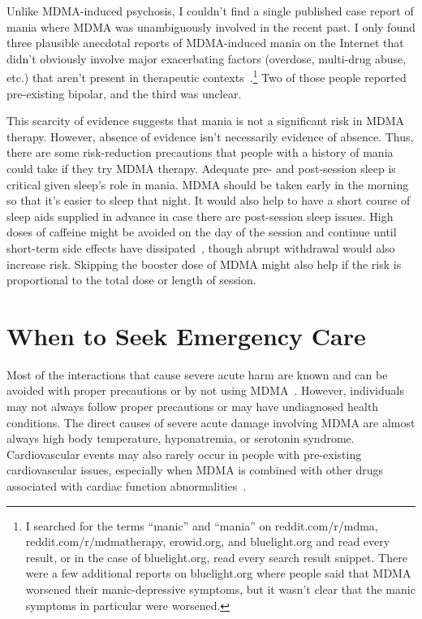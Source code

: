 \documentclass[11pt,oneside]{book}
\let\cite\parencite
\begin{document}
\begin{itemize}
    Unlike MDMA-induced psychosis, I couldn't find a single published case report of mania where MDMA was unambiguously involved in the recent past. I only found three plausible anecdotal reports of MDMA-induced mania on the Internet that didn't obviously involve major exacerbating factors (overdose, multi-drug abuse, etc.) that aren't present in therapeutic contexts~\cite{erowidMania1,erowidMania2,bluelightMania1}.\footnote{I searched for the terms \enquote{manic} and \enquote{mania} on reddit.com/r/mdma, reddit.com/r/mdmatherapy, erowid.org, and bluelight.org and read every result, or in the case of bluelight.org, read every search result snippet. There were a few additional reports on bluelight.org where people said that MDMA worsened their manic-depressive symptoms, but it wasn't clear that the manic symptoms in particular were worsened.} Two of those people reported pre-existing bipolar, and the third was unclear.

    This scarcity of evidence suggests that mania is not a significant risk in MDMA therapy. However, absence of evidence isn't necessarily evidence of absence. Thus, there are some risk-reduction precautions that people with a history of mania could take if they try MDMA therapy. Adequate pre- and post-session sleep is critical given sleep's role in mania. MDMA should be taken early in the morning so that it's easier to sleep that night. It would also help to have a short course of sleep aids supplied in advance in case there are post-session sleep issues. High doses of caffeine might be avoided on the day of the session and continue until short-term side effects have dissipated~\cite{laraCaffeine}, though abrupt withdrawal would also increase risk. Skipping the booster dose of MDMA might also help if the risk is proportional to the total dose or length of session.
\end{itemize}

\section{When to Seek Emergency Care}
Most of the interactions that cause severe acute harm are known and can be avoided with proper precautions or by not using MDMA~\cite{riggDeaths,malcolmSerotonin}. However, individuals may not always follow proper precautions or may have undiagnosed health conditions. The direct causes of severe acute damage involving MDMA are almost always high body temperature, hyponatremia, or serotonin syndrome. Cardiovascular events may also rarely occur in people with pre-existing cardiovascular issues, especially when MDMA is combined with other drugs associated with cardiac function abnormalities~\cite{makunts2023concomitant}.
\end{document}
